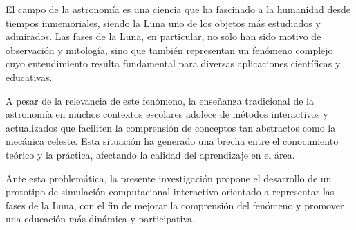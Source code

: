 El campo de la astronomía es una ciencia que ha fascinado a la humanidad desde tiempos inmemoriales,
siendo la Luna uno de los objetos más estudiados y admirados. Las fases de la Luna, en particular,
no solo han sido motivo de observación y mitología, sino que también representan un fenómeno complejo
cuyo entendimiento resulta fundamental para diversas aplicaciones científicas y educativas.

A pesar de la relevancia de este fenómeno, la enseñanza tradicional de la astronomía en muchos contextos escolares
adolece de métodos interactivos y actualizados que faciliten la comprensión de conceptos tan abstractos como la mecánica celeste. 
Esta situación ha generado una brecha entre el conocimiento teórico y la práctica, afectando la calidad del aprendizaje en el área.

Ante esta problemática, la presente investigación propone el desarrollo de un prototipo de simulación computacional interactivo orientado 
a representar las fases de la Luna, con el fin de mejorar la comprensión del fenómeno y promover una educación más dinámica y participativa.
